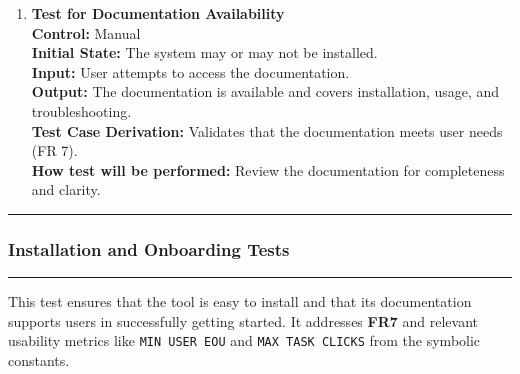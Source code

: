 \documentclass[12pt, titlepage]{article}
\newcommand{\colorrule}{\textcolor{BlueViolet}{\rule{\linewidth}{2pt}}}
\begin{document}
\begin{enumerate}[label={\bf
    \textcolor{Maroon}{test-FR-DA-\arabic*}}, wide=0pt, font=\itshape]
  \item \textbf{Test for Documentation Availability}\\[2mm]
    \textbf{Control:} Manual\\
    \textbf{Initial State:} The system may or may not be installed.\\
    \textbf{Input:} User attempts to access the documentation.\\
    \textbf{Output:} The documentation is available and covers
    installation, usage, and troubleshooting.\\[2mm]
    \textbf{Test Case Derivation:} Validates that the documentation
    meets user needs (FR 7).\\[2mm]
    \textbf{How test will be performed:} Review the documentation for
    completeness and clarity.
\end{enumerate}

\noindent
\colorrule

\subsubsection{Installation and Onboarding Tests}
\colorrule

\medskip

\noindent
This test ensures that the tool is easy to install and that its documentation supports users in successfully getting started. It addresses \textbf{FR7} and relevant usability metrics like \texttt{MIN USER EOU} and \texttt{MAX TASK CLICKS} from the symbolic constants.
\end{document}
